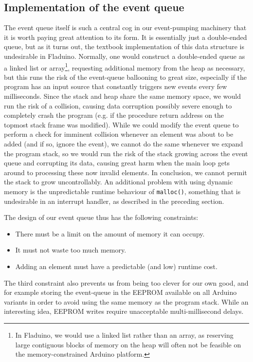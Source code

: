 \documentclass[a4paper, oneside, final]{memoir}
\begin{document}
\subsection{Implementation of the event queue}
\label{sec:event_queue}
The event queue itself is such a central cog in our event-pumping
machinery that it is worth paying great attention to its form.  It is
essentially just a double-ended queue, but as it turns out, the
textbook implementation of this data structure is undesirable in
Fladuino.  Normally, one would construct a double-ended queue as a
linked list or array\footnote{In Fladuino, we would use a linked list
  rather than an array, as reserving large contiguous blocks of memory
  on the heap will often not be feasible on the memory-constrained
  Arduino platform.}, requesting additional memory from the heap as
necessary, but this runs the risk of the event-queue ballooning to
great size, especially if the program has an input source that
constantly triggers new events every few milliseconds.  Since the
stack and heap share the same memory space, we would run the risk of a
collision, causing data corruption possibly severe enough to
completely crash the program (e.g. if the procedure return address on
the topmost stack frame was modified).  While we could modify the
event queue to perform a check for imminent collision whenever an
element was about to be added (and if so, ignore the event), we cannot
do the same whenever we expand the program stack, so we would run the
risk of the stack growing across the event queue and corrupting its
data, causing great harm when the main loop gets around to processing
these now invalid elements.  In conclusion, we cannot permit the stack
to grow uncontrollably.  An additional problem with using dynamic
memory is the unpredictable runtime behaviour of \texttt{malloc()},
something that is undesirable in an interrupt handler, as described in
the preceding section.

The design of our event queue thus has the following constraints:

\begin{itemize}
\item There must be a limit on the amount of memory it can occupy.
\item It must not waste too much memory.
\item Adding an element must have a predictable (and low) runtime
  cost.
\end{itemize}

The third constraint also prevents us from being too clever for our
own good, and for example storing the event-queue in the EEPROM
available on all Arduino variants in order to avoid using the same
memory as the program stack.  While an interesting idea, EEPROM writes
require unacceptable multi-millisecond delays.
\end{document}
